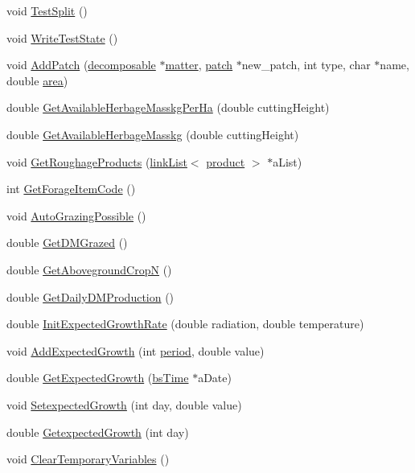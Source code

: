 \begin{DoxyCompactItemize}
\item 
void \hyperlink{classfield_a5aa65cb86171ccbeb39c0ca6c462bd77}{TestSplit} ()
\item 
void \hyperlink{classfield_abd9213abba8f8304ad579eb91363aba4}{WriteTestState} ()
\item 
void \hyperlink{classfield_a78efd8f2b5f220ddfec85b4ad847d79a}{AddPatch} (\hyperlink{classdecomposable}{decomposable} $\ast$\hyperlink{classmatter}{matter}, \hyperlink{classpatch}{patch} $\ast$new\_\-patch, int type, char $\ast$name, double \hyperlink{classfield_a500a3007e7d5ce1b18e950abbe4c7a21}{area})
\item 
double \hyperlink{classfield_aa89adadc9a47424d3bac9305baf57384}{GetAvailableHerbageMasskgPerHa} (double cuttingHeight)
\item 
double \hyperlink{classfield_ac7b4f7eb002f1f49ce00734f2177cc87}{GetAvailableHerbageMasskg} (double cuttingHeight)
\item 
void \hyperlink{classfield_ae6d7a8d477727df7370ae82fb63c7781}{GetRoughageProducts} (\hyperlink{classlink_list}{linkList}$<$ \hyperlink{classproduct}{product} $>$ $\ast$aList)
\item 
int \hyperlink{classfield_a0354c55d8c1fff919fd9f54ede284d64}{GetForageItemCode} ()
\item 
void \hyperlink{classfield_a62798f048b9b2b4c7c4ba3e5ff6f0694}{AutoGrazingPossible} ()
\item 
double \hyperlink{classfield_a2bb1e4784fca6aed504a2ab7d4f200a0}{GetDMGrazed} ()
\item 
double \hyperlink{classfield_a106ff033bc0271d52377d1c25b5e297b}{GetAbovegroundCropN} ()
\item 
double \hyperlink{classfield_a3b566f2cfcd110bb6acdc6912d3ab3c9}{GetDailyDMProduction} ()
\item 
double \hyperlink{classfield_ac93fd3654dbd322021fcd0c92475e39b}{InitExpectedGrowthRate} (double radiation, double temperature)
\item 
void \hyperlink{classfield_a3e63fc647748d3e072b82aeed08f2727}{AddExpectedGrowth} (int \hyperlink{classperiod}{period}, double value)
\item 
double \hyperlink{classfield_aaa9134b4cb75d4cbed4c90015f20b48f}{GetExpectedGrowth} (\hyperlink{classbs_time}{bsTime} $\ast$aDate)
\item 
void \hyperlink{classfield_a7a6c11488529bfc2cada2caec2f56dc1}{SetexpectedGrowth} (int day, double value)
\item 
double \hyperlink{classfield_a090eef7a1e95aaa0d997f14952d7068e}{GetexpectedGrowth} (int day)
\item 
void \hyperlink{classfield_ae1b97f96f274b114d6d92c1ce80f3dfd}{ClearTemporaryVariables} ()
\end{DoxyCompactItemize}

